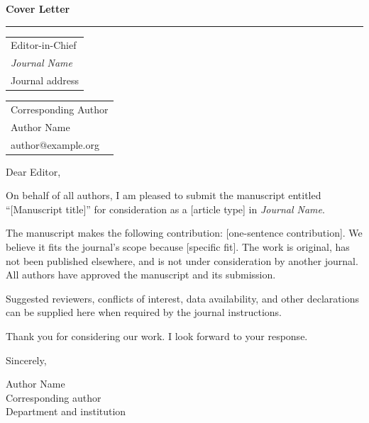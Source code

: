 \documentclass[11pt]{article}
\begin{document}
{\color{chdblue}\LARGE\bfseries Cover Letter}\par
\color{chdblue}\rule{\linewidth}{1pt}\color{black}\vspace{8pt}
\begin{tabular}{@{}l@{}}
Editor-in-Chief\\\textit{Journal Name}\\Journal address
\end{tabular}\hfill
\begin{tabular}{@{}l@{}}
Corresponding Author\\Author Name\\author@example.org
\end{tabular}

Dear Editor,

On behalf of all authors, I am pleased to submit the manuscript entitled
``[Manuscript title]'' for consideration as a [article type] in \textit{Journal
Name}.

The manuscript makes the following contribution: [one-sentence contribution].
We believe it fits the journal's scope because [specific fit]. The work is
original, has not been published elsewhere, and is not under consideration by
another journal. All authors have approved the manuscript and its submission.

Suggested reviewers, conflicts of interest, data availability, and other
declarations can be supplied here when required by the journal instructions.

Thank you for considering our work. I look forward to your response.

Sincerely,\par\vspace{10pt}
Author Name\\Corresponding author\\Department and institution
\end{document}
